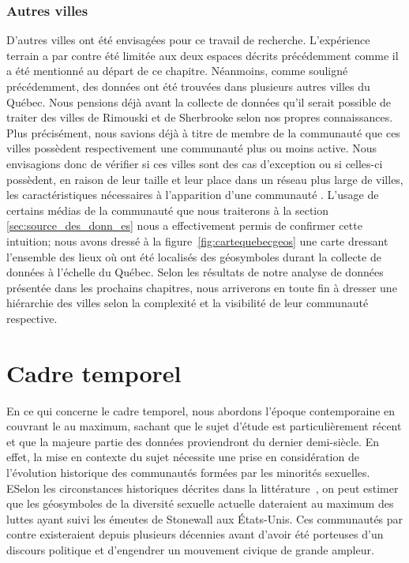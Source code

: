 \subsubsection{Autres villes}
\label{ssub:autres_villes}
D'autres villes ont été envisagées pour ce travail de recherche.
L'expérience terrain a par contre été limitée aux deux espaces décrits précédemment comme il a été mentionné au départ de ce chapitre.
Néanmoins, comme souligné précédemment, des données ont été trouvées dans plusieurs autres villes du Québec.
Nous pensions déjà avant la collecte de données qu'il serait possible de traiter des villes de Rimouski et de Sherbrooke selon nos propres connaissances.
Plus précisément, nous savions déjà à titre de membre de la communauté \lgbt{} que ces villes possèdent respectivement une communauté plus ou moins active.
Nous envisagions donc de vérifier si ces villes sont des cas d'exception ou si celles-ci possèdent, en raison de leur taille et leur place dans un réseau plus large de villes, les caractéristiques nécessaires à l'apparition d'une communauté \lgbt.
L'usage de certains médias de la communauté que nous traiterons à la section \ref{sec:source_des_donn_es} nous a effectivement permis de confirmer cette intuition; nous avons dressé à la figure~\ref{fig:cartequebecgeos} une carte dressant l'ensemble des lieux où ont été localisés des géosymboles durant la collecte de données à l'échelle du Québec.
Selon les résultats de notre analyse de données présentée dans les prochains chapitres, nous arriverons en toute fin à dresser une hiérarchie des villes selon la complexité et la visibilité de leur communauté respective.

\section{Cadre temporel}
\label{sec:cadre_temporel}
En ce qui concerne le cadre temporel, nous abordons l'époque contemporaine en couvrant le  au maximum, sachant que le sujet d'étude est particulièrement récent et que la majeure partie des données proviendront du dernier demi-siècle.
En effet, la mise en contexte du sujet nécessite une prise en considération de l'évolution historique des communautés formées par les minorités sexuelles.
ESelon les circonstances historiques décrites dans la littérature~\citep{Spencer2005}, on peut estimer que les géosymboles de la diversité sexuelle actuelle dateraient au maximum des luttes ayant suivi les émeutes de Stonewall aux États-Unis.
Ces communautés par contre existeraient depuis plusieurs décennies avant d'avoir été porteuses d'un discours politique et d'engendrer un mouvement civique de grande ampleur.

